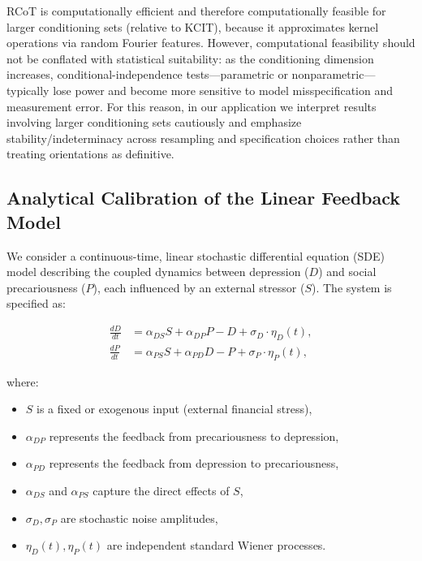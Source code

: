 \documentclass[
]{article}
\providecommand{\tightlist}{%
  \setlength{\itemsep}{0pt}\setlength{\parskip}{0pt}}\usepackage{longtable,booktabs,array}
\begin{document}
RCoT is computationally efficient and therefore computationally feasible
for larger conditioning sets (relative to KCIT), because it approximates
kernel operations via random Fourier features. However, computational
feasibility should not be conflated with statistical suitability: as the
conditioning dimension increases, conditional-independence
tests---parametric or nonparametric---typically lose power and become
more sensitive to model misspecification and measurement error. For this
reason, in our application we interpret results involving larger
conditioning sets cautiously and emphasize stability/indeterminacy
across resampling and specification choices rather than treating
orientations as definitive.

\subsection{Analytical Calibration of the Linear Feedback
Model}\label{sec-analcalibration}

We consider a continuous-time, linear stochastic differential equation
(SDE) model describing the coupled dynamics between depression (\(D\))
and social precariousness (\(P\)), each influenced by an external
stressor (\(S\)). The system is specified as:

\[
\begin{aligned}
\frac{dD}{dt} &= \alpha_{DS} S + \alpha_{DP} P - D + \sigma_D \cdot \eta_D(t), \\
\frac{dP}{dt} &= \alpha_{PS} S + \alpha_{PD} D - P + \sigma_P \cdot \eta_P(t),
\end{aligned}
\]

where:

\begin{itemize}
\tightlist
\item
  \(S\) is a fixed or exogenous input (external financial stress),
\item
  \(\alpha_{DP}\) represents the feedback from precariousness to
  depression,
\item
  \(\alpha_{PD}\) represents the feedback from depression to
  precariousness,
\item
  \(\alpha_{DS}\) and \(\alpha_{PS}\) capture the direct effects of
  \(S\),
\item
  \(\sigma_D, \sigma_P\) are stochastic noise amplitudes,
\item
  \(\eta_D(t), \eta_P(t)\) are independent standard Wiener processes.
\end{itemize}
\end{document}
